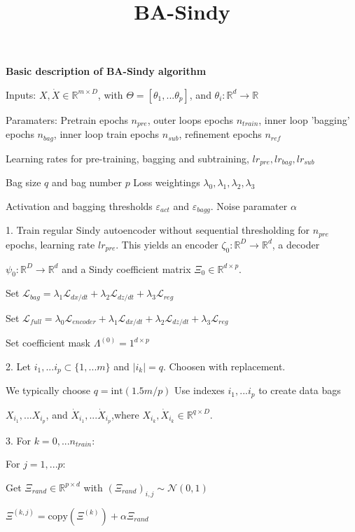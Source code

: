 \documentclass[11pt]{article}
\title{ BA-Sindy}
\author{}
\newcommand{\ms}{{\medskip}}
\newcommand{\sms}{{\smallskip}}
\newcommand{\R}{\mathbb{R}}
\renewcommand{\epsilon}{\varepsilon}
\newcommand{\tb}{\textbf}
\newcommand{\func}[3]{#1: #2\rightarrow#3}
\begin{document}
\centerline{\tb{Basic description of BA-Sindy algorithm}}

\ms

Inputs:  $X,\dot{X} \in \R^{m \times D}$,   with $\Theta = [\theta_1,...\theta_p]$,  
and $\func{\theta_i}{\R^d}{\R}$

Paramaters:  Pretrain epochs $n_{pre}$,  outer loops epochs $n_{train}$,  inner loop 'bagging' epochs $n_{bag}$,   inner loop train epochs $n_{sub}$, refinement epochs $n_{ref}$

Learning rates for pre-training,  bagging and subtraining, $lr_{pre},  lr_{bag}, lr_{sub}$

Bag size $q$ and  bag number $p$ Loss weightings $\lambda_0 , \lambda_1,  \lambda_2,  \lambda_3$

Activation and bagging thresholds $\epsilon_{act}$ and $\epsilon_{bagg}$.  Noise paramater $\alpha$

\sms

1.  Train regular Sindy autoencoder without sequential thresholding for $n_{pre}$ epochs, learning rate $lr_{pre}$.  This yields an encoder $\func{\zeta_0}{\R^D}{\R^d}$,  a decoder 

$\func{\psi_0}{\R^D}{\R^d}$ and a  Sindy coefficient matrix $\Xi_0 \in \R^{d\times p}$.

Set $\mathcal{L}_{bag} = \lambda_1\mathcal{L}_{dx/dt} +  \lambda_2\mathcal{L}_{dz/dt} + \lambda_3\mathcal{L}_{reg}$

Set $\mathcal{L}_{full} =\lambda_0\mathcal{L}_{encoder} + \lambda_1\mathcal{L}_{dx/dt} +  \lambda_2\mathcal{L}_{dz/dt} + \lambda_3\mathcal{L}_{reg}$

Set coefficient mask $\Lambda^{(0)} = 1^{d\times p}$


2.   Let $i_1,...i_p \subset \{1,...m\}$ and $|i_k| = q$.   Choosen with replacement.   

We typically choose $q = \text{int}(1.5m/p)$
Use indexes $i_1,...i_p$ to create data bags

 $X_{i_1},...X_{i_p}$,  and  
$\dot{X}_{i_1},...\dot{X}_{i_p}$,where $X_{i_k},\dot{X}_{i_k} \in \R^{q \times D}$.  


3.  For $k = 0,... n_{train}$:
 
\hspace{15 pt} For $j = 1,...p$:

\hspace{30 pt} Get $\Xi_{rand} \in \R^{p \times d}$  with $(\Xi_{rand})_{i,j} \sim \mathcal{N}(0,1)$

\hspace{30 pt} $\Xi^{(k,j)}= \text{copy}(\Xi^{(k)})  + \alpha \Xi_{rand}$
\end{document}
